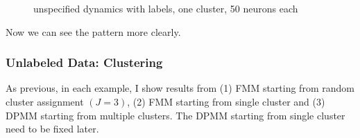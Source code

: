 \documentclass[]{article}
\begin{document}
\begin{enumerate}
\begin{figure}[h!]
{			\centering
		}
		\caption{unspecified dynamics with labels, one cluster, 50 neurons each}
		\label{fig:no A labeled one cluster 50}
	\end{figure}

	Now we can see the pattern more clearly.
\end{enumerate}

\subsubsection{Unlabeled Data: Clustering}
As previous, in each example, I show results from (1) FMM starting from random cluster assignment \(\left(J = 3\right) \), (2) FMM starting from single cluster and (3) DPMM starting from multiple clusters. The DPMM starting from single cluster need to be fixed later.
\end{document}
